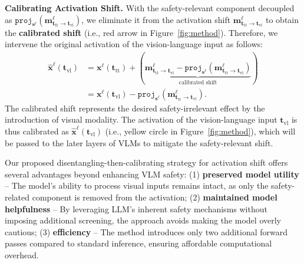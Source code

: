 \textbf{Calibrating Activation Shift.} 
With the safety-relevant component decoupled as $\mathtt{proj}_{\mathbf{s}^\ell}(\mathbf{m}^\ell_{\mathbf{t}_\text{tt}\rightarrow \mathbf{t}_\text{vl}})$, we eliminate it from the activation shift $\mathbf{m}^\ell_{\mathbf{t}_\text{tt}\rightarrow \mathbf{t}_\text{vl}}$ to obtain the \textbf{calibrated shift} (i.e., red arrow in Figure~\ref{fig:method}). Therefore, we intervene the original activation of the vision-language input as follows: 
\begin{align}
    \hat{\mathbf{x}}^\ell (\mathbf{t}_\text{vl}) & = \mathbf{x}^\ell (\mathbf{t}_\text{tt}) + (\underbrace{\mathbf{m}^\ell_{\mathbf{t}_\text{tt}\rightarrow \mathbf{t}_\text{vl}}-\mathtt{proj}_{\mathbf{s}^\ell}(\mathbf{m}^\ell_{\mathbf{t}_\text{tt}\rightarrow \mathbf{t}_\text{vl}})}_\text{calibrated shift})\nonumber \\
    & =  \mathbf{x}^\ell (\mathbf{t}_\text{vl}) - \mathtt{proj}_{\mathbf{s}^\ell}(\mathbf{m}^\ell_{\mathbf{t}_\text{tt}\rightarrow \mathbf{t}_\text{vl}}).
\end{align}
The calibrated shift represents the desired safety-irrelevant effect by the introduction of visual modality. The activation of the vision-language input $\mathbf{t}_\text{vl}$ is thus calibrated as $\hat{\mathbf{x}}^\ell (\mathbf{t}_\text{vl})$ (i.e., yellow circle in Figure~\ref{fig:method}), which will be passed to the later layers of VLMs to mitigate the safety-relevant shift. 

Our proposed disentangling-then-calibrating strategy for activation shift offers several advantages beyond enhancing VLM safety: (1) \textbf{preserved model utility} -- The model's ability to process visual inputs remains intact, as only the safety-related component is removed from the activation; (2) \textbf{maintained model helpfulness} -- By leveraging LLM's inherent safety mechanisms without imposing additional screening, the approach avoids making the model overly cautious; (3) \textbf{efficiency} -- The method introduces only two additional forward passes compared to standard inference, ensuring affordable computational overhead. 


